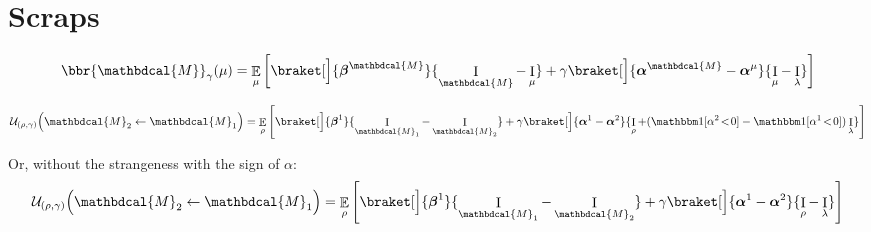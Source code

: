 \documentclass[twoside]{article} %
\theoremstyle{plain}
\theoremstyle{definition}
\DeclareMathOperator{\I}{\mathrm{I}} %
\DeclareMathOperator*{\Ex}{\mathbb{E}} %
\newcommand{\balpha}{\boldsymbol\alpha}
\newcommand{\bbeta}{\boldsymbol\beta}
\newcommand{\dg}[1]{\mathbdcal{#1}}
\begin{document}
\section{Scraps}     

\begin{align*}
   \bbr{\dg M}_\gamma(\mu) = 
   \Ex_{\mu}\left[
       \braket[\Big]{\bbeta^{\dg M}}{\I_{\dg M}- \I_{\mu}}
       + \gamma
       \braket[\Big]{\balpha^{\dg M} - \balpha^{\mu}} {\I_\mu - \I_\lambda}
   \right]
\end{align*}

\[
\mathcal U_{(\rho, \gamma)}\Big(\dg M_2 \gets \dg M_1 \Big)  = 
   \Ex_{\rho}\left[
       \braket[\Big]{\bbeta^{1}}{\I_{\dg M_1}- \I_{\dg M_2}}
       + \gamma
       \braket[\Big]{\balpha^{1} - \balpha^{2}} {\I_\rho + (\mathbbm1[\alpha^2 \!<\!0] - \mathbbm1[\alpha^1\!<\!0])\I_\lambda}
   \right]
\]

Or, without the strangeness with the sign of $\alpha$:
\[
\mathcal U_{(\rho, \gamma)}\Big(\dg M_2 \gets \dg M_1 \Big)  = 
   \Ex_{\rho}\left[
       \braket[\Big]{\bbeta^{1}}{\I_{\dg M_1}- \I_{\dg M_2}}
       + \gamma
       \braket[\Big]{\balpha^{1} - \balpha^{2}} {\I_\rho - \I_\lambda}
   \right]
\]
\end{document}
